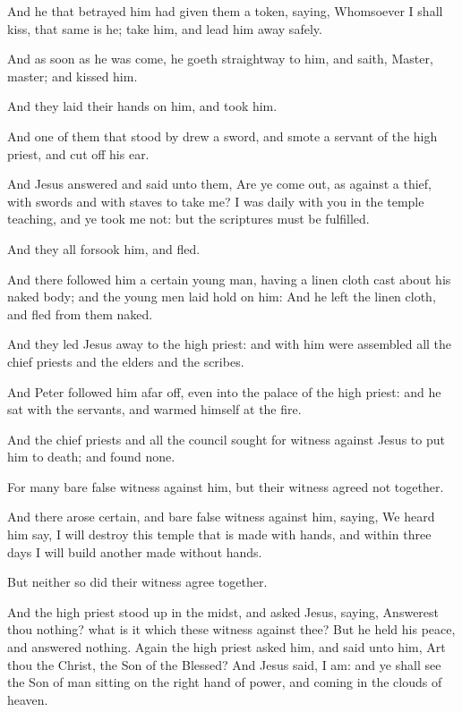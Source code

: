 \Verse And he that betrayed him had given them a token, saying, Whomsoever I shall kiss, that same is he; take him, and lead him away safely.

\Verse And as soon as he was come, he goeth straightway to him, and saith, Master, master; and kissed him.

\Verse And they laid their hands on him, and took him.

\Verse And one of them that stood by drew a sword, and smote a servant of the high priest, and cut off his ear.

\Verse And Jesus answered and said unto them, Are ye come out, as against a thief, with swords and with staves to take me?  \Verse I was daily with you in the temple teaching, and ye took me not: but the scriptures must be fulfilled.

\Verse And they all forsook him, and fled.

\Verse And there followed him a certain young man, having a linen cloth cast about his naked body; and the young men laid hold on him: \Verse And he left the linen cloth, and fled from them naked.

\Verse And they led Jesus away to the high priest: and with him were assembled all the chief priests and the elders and the scribes.

\Verse And Peter followed him afar off, even into the palace of the high priest: and he sat with the servants, and warmed himself at the fire.

\Verse And the chief priests and all the council sought for witness against Jesus to put him to death; and found none.

\Verse For many bare false witness against him, but their witness agreed not together.

\Verse And there arose certain, and bare false witness against him, saying, \Verse We heard him say, I will destroy this temple that is made with hands, and within three days I will build another made without hands.

\Verse But neither so did their witness agree together.

\Verse And the high priest stood up in the midst, and asked Jesus, saying, Answerest thou nothing? what is it which these witness against thee?  \Verse But he held his peace, and answered nothing. Again the high priest asked him, and said unto him, Art thou the Christ, the Son of the Blessed?  \Verse And Jesus said, I am: and ye shall see the Son of man sitting on the right hand of power, and coming in the clouds of heaven.

